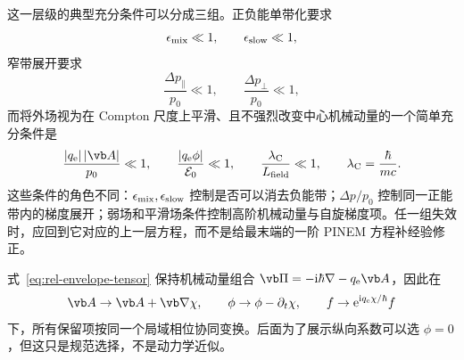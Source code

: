 这一层级的典型充分条件可以分成三组。正负能单带化要求
\begin{equation}
\epsilon_{\rm mix}\ll1,
\qquad
\epsilon_{\rm slow}\ll1,
\end{equation}
窄带展开要求
\begin{equation}
\frac{\Delta p_\parallel}{p_0}\ll1,
\qquad
\frac{\Delta p_\perp}{p_0}\ll1,
\label{eq:narrowband-conditions-vector}
\end{equation}
而将外场视为在 Compton 尺度上平滑、且不强烈改变中心机械动量的一个简单充分条件是
\begin{equation}
{
\frac{|q_{\rm e}|\,|\vb A|}{p_0}\ll1,
\qquad
\frac{|q_{\rm e}\phi|}{\mathcal E_0}\ll1,
\qquad
\frac{\lambda_{\rm C}}{L_{\rm field}}\ll1,
\qquad
\lambda_{\rm C}=\frac{\hbar}{mc}.}
\label{eq:positive-band-conditions}
\end{equation}
这些条件的角色不同：$\epsilon_{\rm mix},\epsilon_{\rm slow}$ 控制是否可以消去负能带；$\Delta p/p_0$ 控制同一正能带内的梯度展开；弱场和平滑场条件控制高阶机械动量与自旋梯度项。任一组失效时，应回到它对应的上一层方程，而不是给最末端的一阶 PINEM 方程补经验修正。

式~\cref{eq:rel-envelope-tensor} 保持机械动量组合 $\vb\Pi=-\ii\hbar\nabla-q_{\rm e}\vb A$，因此在
\begin{equation}
\vb A\rightarrow\vb A+\vb\nabla\chi,
\qquad
\phi\rightarrow\phi-\partial_t\chi,
\qquad
f\rightarrow\ee^{\ii q_{\rm e}\chi/\hbar}f
\label{eq:gauge-transform-standard}
\end{equation}
下，所有保留项按同一个局域相位协同变换。后面为了展示纵向系数可以选 $\phi=0$，但这只是规范选择，不是动力学近似。

